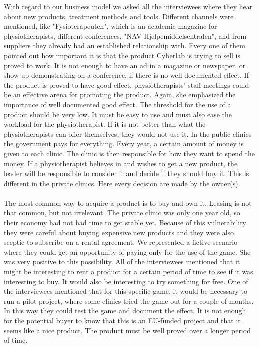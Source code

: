 With regard to our business model we asked all the interviewees where they hear about new products, treatment methods and tools. Different channels were mentioned, like "Fysioterapeuten", which is an academic magazine for physiotherapists, different conferences, "NAV Hjelpemiddelsentralen", and from suppliers they already had an established relationship with. Every one of them pointed out how important it is that the product Cyberlab is trying to sell is proved to work. It is not enough to have an ad in a magazine or newspaper, or show up demonstrating on a conference, if there is no well documented effect. If the product is proved to have good effect, physiotherapists' staff meetings could be an effective arena for promoting the product. Again, she emphasized the importance of well documented good effect. The threshold for the use of a product should be very low. It must be easy to use and must also ease the workload for the physiotherapist. If it is not better than what the physiotherapists can offer themselves, they would not use it. In the public clinics the government pays for everything. Every year, a certain amount of money is given to each clinic. The clinic is then responsible for how they want to spend the money. If a physiotherapist believes in and wishes to get a new product, the leader will be responsible to consider it and decide if they should buy it. This is different in the private clinics. Here every decision are made by the owner(s). \\ \\
The most common way to acquire a product is to buy and own it. Leasing is not that common, but not irrelevant. The private clinic was only one year old, so their economy had not had time to get stable yet. Because of this vulnerability they were careful about buying expensive new products and they were also sceptic to subscribe on a rental agreement. We represented a fictive scenario where they could get an opportunity of paying only for the use of the game. She was very positive to this possibility. All of the interviewees mentioned that it might be interesting to rent a product for a certain period of time to see if it was interesting to buy. It would also be interesting to try something for free.  One of the interviewees mentioned that for this specific game, it would be necessary to run a pilot project, where some clinics tried the game out for a couple of months. In this way they could test the game and document the effect. It is not enough for the potential buyer to know that this is an EU-funded project and that it seems like a nice product. The product must be well proved over a longer period of time. \\ \\
